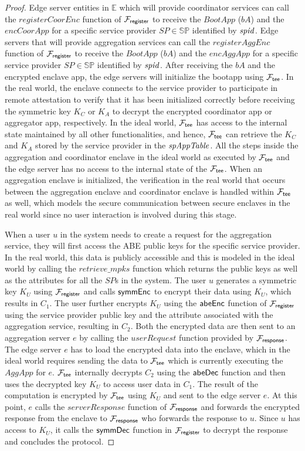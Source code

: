 \begin{proof}
Edge server entities in $\mathbb{E}$ which will provide coordinator services can call the $registerCoorEnc$ function of $\mathcal{F}_{\mathsf{register}}$ to receive the $BootApp$ ($bA$) and the $encCoorApp$ for a specific service provider $SP \in \mathbb{SP}$ identified by $\mathit{spid}$. 
Edge servers that will provide aggregation services can call the $registerAggEnc$ function of $\mathcal{F}_{\mathsf{register}}$ to receive the $BootApp$ ($bA$) and the $encAggApp$ for a specific service provider $SP \in \mathbb{SP}$ identified by $\mathit{spid}$. 
After receiving the $bA$ and the encrypted enclave app, the edge servers will initialize the bootapp using $\mathcal{F}_{\mathsf{tee}}$. In the real world, the enclave connects to the service provider to participate in remote attestation to verify that it has been initialized correctly before receiving the symmetric key $K_C$ or $K_A$ to decrypt the encrypted coordinator app or aggregator app, respectively. In the ideal world, $\mathcal{F}_{\mathsf{tee}}$ has access to the internal state maintained by all other functionalities, and hence, $\mathcal{F}_{\mathsf{tee}}$ can retrieve the $K_C$ and $K_A$ stored by the service provider in the $\mathit{spAppTable}$. All the steps inside the aggregation and coordinator enclave in the ideal world as executed by $\mathcal{F}_{\mathsf{tee}}$ and the edge server has no access to the internal state of the $\mathcal{F}_{\mathsf{tee}}$. When an aggregation enclave is initialized, the verification in the real world that occurs between the aggregation enclave and coordinator enclave is handled within $\mathcal{F}_{\mathsf{tee}}$ as well, which models the secure communication between secure enclaves in the real world since no user interaction is involved during this stage.

When a user $u$ in the system needs to create a request for the aggregation service, they will first access the ABE public keys for the specific service provider. In the real world, this data is publicly accessible and this is modeled in the ideal world by calling the $retrieve\_mpks$ function which returns the public keys as well as the attributes for all the $SP$s in the system. The user $u$ generates a symmetric key $K_U$ using $\mathcal{F}_{\mathsf{register}}$ and calls $\mathsf{symmEnc}$ to encrypt their data using $K_U$, which results in $C_1$. The user further encrypts $K_U$ using the $\mathsf{abeEnc}$ function of $\mathcal{F}_{\mathsf{register}}$ using the service provider public key and the attribute associated with the aggregation service, resulting in $C_2$. Both the encrypted data are then sent to an aggregation server $e$ by calling the $userRequest$ function provided by $\mathcal{F}_{\mathsf{response}}$. The edge server $e$ has to load the encrypted data into the enclave, which in the ideal world requires sending the data to $\mathcal{F}_{\mathsf{tee}}$ which is currently executing the $AggApp$ for $e$. 
$\mathcal{F}_{\mathsf{tee}}$ internally decrypts $C_2$ using the $\mathsf{abeDec}$ function and then uses the decrypted key $K_U$ to access user data in $C_1$. The result of the computation is encrypted by $\mathcal{F}_{\mathsf{tee}}$ using $K_U$  and sent to the edge server $e$. 
At this point, $e$ calls the $serverResponse$ function of $\mathcal{F}_{\mathsf{response}}$ and forwards the encrypted response from the enclave to $\mathcal{F}_{\mathsf{response}}$ who forwards the response to $u$. 
Since $u$ has access to $K_U$, it calls the $\mathsf{symmDec}$ function in $\mathcal{F}_{\mathsf{register}}$ to decrypt the response and concludes the protocol.


\end{proof}
